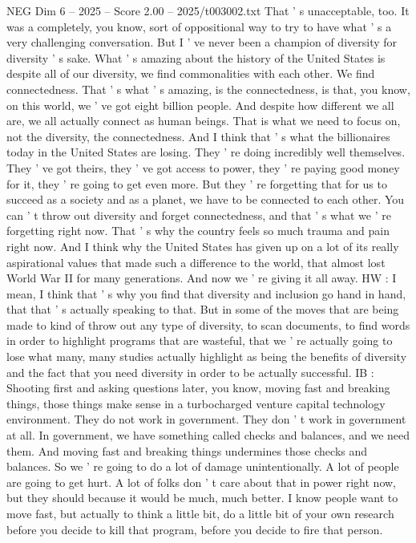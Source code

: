 \begin{textsample}{NEG Dim 6 – 2025 – Score 2.00 – 2025/t003002.txt}
That ' s unacceptable, too.
It was a completely, you know, sort of oppositional way to try to have what ' s a very challenging conversation.
But I ' ve never been a champion of diversity for diversity ' s sake.
What ' s amazing about the history of the United States is despite all of our diversity, we find commonalities with each other.
We find connectedness.
That ' s what ' s amazing, is the connectedness, is that, you know, on this world, we ' ve got eight billion people.
And despite how different we all are, we all actually connect as human beings.
That is what we need to focus on, not the diversity, the connectedness.
And I think that ' s what the billionaires today in the United States are losing.
They ' re doing incredibly well themselves.
They ' ve got theirs, they ' ve got access to power, they ' re paying good money for it, they ' re going to get even more.
But they ' re forgetting that for us to succeed as a society and as a planet, we have to be connected to each other.
You can ' t throw out diversity and forget connectedness, and that ' s what we ' re forgetting right now.
That ' s why the country feels so much trauma and pain right now.
And I think why the United States has given up on a lot of its really aspirational values that made such a difference to the world, that almost lost World War II for many generations.
And now we ' re giving it all away.
HW : I mean, I think that ' s why you find that diversity and inclusion go hand in hand, that that ' s actually speaking to that.
But in some of the moves that are being made to kind of throw out any type of diversity, to scan documents, to find words in order to highlight programs that are wasteful, that we ' re actually going to lose what many, many studies actually highlight as being the benefits of diversity and the fact that you need diversity in order to be actually successful.
IB : Shooting first and asking questions later, you know, moving fast and breaking things, those things make sense in a turbocharged venture capital technology environment.
They do not work in government.
They don ' t work in government at all.
In government, we have something called checks and balances, and we need them.
And moving fast and breaking things undermines those checks and balances.
So we ' re going to do a lot of damage unintentionally.
A lot of people are going to get hurt.
A lot of folks don ' t care about that in power right now, but they should because it would be much, much better.
I know people want to move fast, but actually to think a little bit, do a little bit of your own research before you decide to kill that program, before you decide to fire that person.

\end{textsample}
